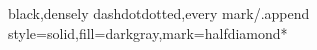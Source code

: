 \documentclass[a4paper]{article}
\begin{document}
{	black,densely dashdotdotted,every mark/.append style={solid,fill=darkgray},mark=halfdiamond*\\
}
\end{document}
